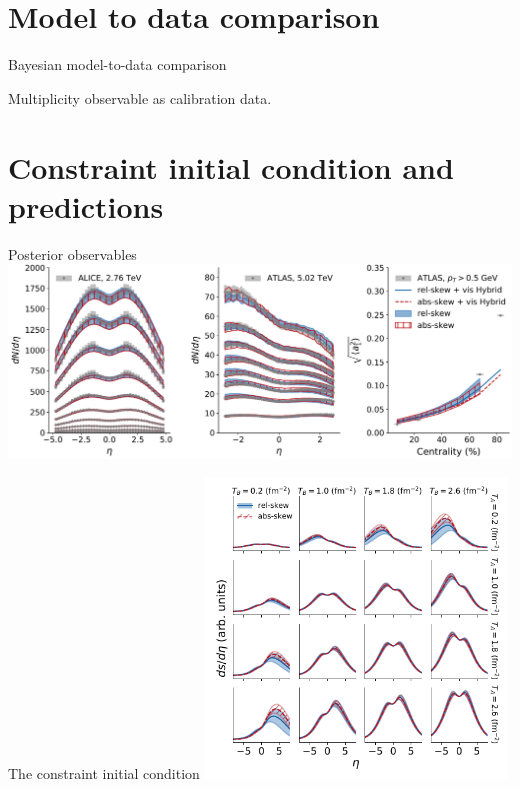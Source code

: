 \documentclass[11pt]{beamer}
\begin{document}
\section{Model to data comparison}
\begin{frame}{Bayesian model-to-data comparison}

\end{frame}
\begin{frame}{Multiplicity observable as calibration data.}

\end{frame}

\section{Constraint initial condition and predictions}
\begin{frame}{Posterior observables}
\includegraphics[width=\textwidth]{post_obs.pdf}
\end{frame}

\begin{frame}{The constraint initial condition}
\includegraphics[width=0.6\textwidth]{post_dsdy.pdf}
\end{frame}
\end{document}
